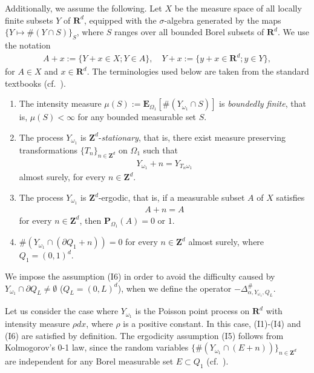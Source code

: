\documentclass[12pt,a4paper]{article}
\begin{document}
Additionally, we assume the following.
Let $X$ be the measure space of all locally finite subsets $Y$ of 
$\mathbf{R}^d$,
equipped with the $\sigma$-algebra generated by the maps
$\{Y\mapsto\#(Y\cap S)\}_S$, where $S$ ranges over 
all bounded Borel subsets of $\mathbf{R}^d$.
We use the notation
\begin{align*}
 A+x :=\{Y+x\in X;Y\in A\},\quad
Y+x:=\{y+x\in \mathbf{R}^d;y\in Y\},
\end{align*}
for $A\in X$ and $x\in \mathbf{R}^d$.
The terminologies used below are taken from the standard textbooks
(cf.\ \cite{La-Pe,Da-Ve1,Kal}).
\begin{enumerate}
 \item[(I3)]
The intensity measure 
$\mu(S):=\mathbf{E}_{\Omega_1}[\#(Y_{\omega_1}\cap S)]$
is \textit{boundedly finite},
that is, $\mu(S)<\infty$ for any bounded measurable set $S$.


 \item[(I4)] The process $Y_{\omega_1}$ is $\mathbf{Z}^d$-\textit{stationary}, that is, there exist measure preserving transformations 
$\{T_n\}_{n\in \mathbf{Z}^d}$ on $\Omega_1$ such that
\begin{align}
\label{06_46}
Y_{\omega_1}+n = Y_{T_n \omega_1}
\end{align}
almost surely, for every $n\in \mathbf{Z}^d$.


 \item[(I5)] The process $Y_{\omega_1}$ is $\mathbf{Z}^d$-ergodic,
that is, if a measurable subset $A$ of $X$ satisfies 
\begin{align*}
 A+n =A
\end{align*}
for every $n\in \mathbf{Z}^d$, then $\mathbf{P}_{\Omega_1}(A)=0$ or $1$.


 \item[(I6)] 
$\#(Y_{\omega_1}\cap(\partial Q_1+n))=0$ 
for every $n\in \mathbf{Z}^d$ almost surely,
where $Q_1=(0,1)^d$.
\end{enumerate}
We impose the assumption (I6) in order to avoid the difficulty
caused by $Y_{\omega_1}\cap \partial Q_L\not=\emptyset$
($Q_L=(0,L)^d$),
when we define the operator $-\Delta^\#_{\alpha,Y_{\omega_1},Q_L}$.

Let us consider the case where $Y_{\omega_1}$ is the Poisson point process 
on $\mathbf{R}^d$ with intensity measure $\rho dx$,
where $\rho$ is a positive constant.
In this case, (I1)-(I4) and (I6) are satisfied
by definition.
The ergodicity assumption (I5) follows from 
Kolmogorov's 0-1 law,
since the random variables 
$\{\#(Y_{\omega_1}\cap(E+n))\}_{n\in \mathbf{Z}^d}$ 
are independent for any Borel measurable set $E\subset Q_1$
(cf.\ \cite[Chapter 20]{Kl}).
\end{document}
